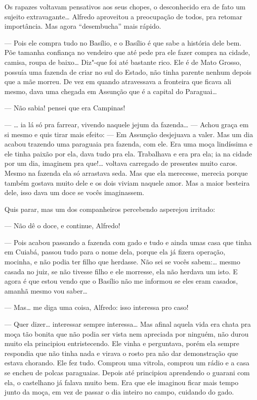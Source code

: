 \begin{linenumbers}
Os rapazes voltavam pensativos aos seus chopes, o desconhecido era de
fato um sujeito extravagante\ldots{} Alfredo aproveitou a preocupação de
todos, pra retomar importância. Mas agora ``desembucha'' mais rápido.

--- Pois ele compra tudo no Basílio, e o Basílio é que sabe a história
dele bem. Põe tamanha confiança no vendeiro que até pede pra ele fazer
compra na cidade, camisa, roupa de baixo\ldots{} Diz"-que foi até bastante
rico. Ele é de Mato Grosso, possuía uma fazenda de criar no sul do
Estado, não tinha parente nenhum depois que a mãe morreu. De vez em
quando atravessava a fronteira que ficava ali mesmo, dava uma chegada em
Assunção que é a capital do Paraguai\ldots{}

--- Não sabia! pensei que era Campinas!

--- \ldots{} ia lá só pra farrear, vivendo naquele jejum da fazenda\ldots{} ---
Achou graça em si mesmo e quis tirar mais efeito: --- Em Assunção
desjejuava a valer. Mas um dia acabou trazendo uma paraguaia pra
fazenda, com ele. Era uma moça lindíssima e ele tinha paixão por ela,
dava tudo pra ela. Trabalhava e era pra ela; ia na cidade por um dia,
imaginem pra que!\ldots{} voltava carregado de presentes muito caros. Mesmo
na fazenda ela só arrastava seda. Mas que ela merecesse, merecia porque
também gostava muito dele e os dois viviam naquele amor. Mas a maior
besteira dele, isso dava um doce se vocês imaginassem.

Quis parar, mas um dos companheiros percebendo asperejou irritado:

--- Não dê o doce, e continue, Alfredo!

--- Pois acabou passando a fazenda com gado e tudo e ainda umas casa que
tinha em Cuiabá, passou tudo para o nome dela, porque ela já fizera
operação, mocinha, e não podia ter filho que herdasse. Não sei se vocês
sabem:\ldots{} mesmo casada no juiz, se não tivesse filho e ele morresse, ela
não herdava um isto. E agora é que estou vendo que o Basílio não me
informou se eles eram casados, amanhã mesmo vou saber\ldots{}

--- Mas\ldots{} me diga uma coisa, Alfredo: isso interessa pro caso!

--- Quer dizer\ldots{} interessar sempre interessa\ldots{} Mas afinal aquela vida
era chata pra moça tão bonita que não podia ser vista nem apreciada por
ninguém, não durou muito ela principiou entristecendo. Ele vinha e
perguntava, porém ela sempre respondia que não tinha nada e virava o
rosto pra não dar demonstração que estava chorando. Ele fez tudo.
Comprou uma vitrola, comprou um rádio e a casa se encheu de polcas
paraguaias. Depois até principiou aprendendo o guarani com ela, o
castelhano já falava muito bem. Era que ele imaginou ficar mais tempo
junto da moça, em vez de passar o dia inteiro no campo, cuidando do
gado.


\end{linenumbers}
